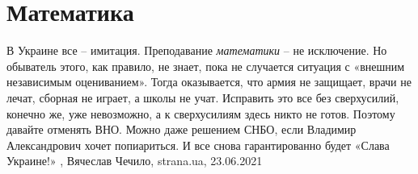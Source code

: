 
 
 
 
 
\chapter{Математика}

В Украине все – имитация. Преподавание \emph{математики} – не исключение. Но обыватель
этого, как правило, не знает, пока не случается ситуация с «внешним независимым
оцениванием». Тогда оказывается, что армия не защищает, врачи не лечат, сборная
не играет, а школы не учат. Исправить это все без сверхусилий, конечно же, уже
невозможно, а к сверхусилиям здесь никто не готов. Поэтому давайте отменять
ВНО. Можно даже решением СНБО, если Владимир Александрович хочет попиариться. И
все снова гарантированно будет «Слава Украине!»
, Вячеслав Чечило, strana.ua, 23.06.2021
